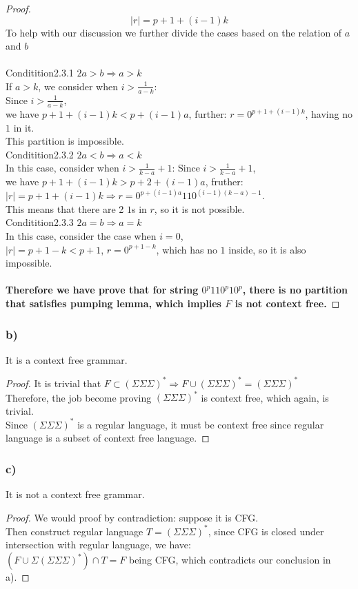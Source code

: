 \documentclass{article}
\begin{document}
\begin{proof}
				$$|r| = p+1+(i-1)k$$
				To help with our discussion we further divide the cases based on the relation of $a$ and $b$\\
			\\
			Conditition2.3.1 $2a > b \Rightarrow a > k$ \\
				If $a>k$, we consider when $i > \frac{1}{a-k}$: \\
				Since $i > \frac{1}{a-k}$, \\
				we have $p+1+(i-1)k < p+(i-1)a$, further:
				$r = 0^{p+1+(i-1)k}$, having no $1$ in it. \\
				This partition is impossible. 
			\\
			Conditition2.3.2 $2a < b \Rightarrow a < k$ \\
				In this case, consider when $i > \frac{1}{k-a} + 1$:
				Since $i > \frac{1}{k-a} + 1$, \\
				we have $p+1+(i-1)k > p+2+(i-1)a$, fruther: 
				$|r| = p+1+(i-1)k \Rightarrow r = 0^{p+(i-1)a}110^{(i-1)(k-a)-1}$.\\
				This means that there are 2 $1$s in $r$, so it is not possible. \\
			Conditition2.3.3 $2a = b \Rightarrow a = k$ \\
				In this case, consider the case when $i = 0$, \\
				$|r| = p+1-k < p + 1$, $r = 0^{p+1-k}$, which has no $1$ inside, so it is also impossible.
		\\ \\
		\textbf{Therefore we have prove that for string $0^{p}110^{p}10^{p}$, there is no partition that satisfies pumping lemma, which implies $F$ is not context free.}

	\end{proof}

\subsubsection{b)}
	It is a context free grammar.
	\begin{proof}
		It is trivial that $F \subset (\Sigma\Sigma\Sigma)^* \Rightarrow F \cup (\Sigma \Sigma \Sigma)^* = (\Sigma \Sigma \Sigma)^*$ \\
		Therefore, the job become proving $(\Sigma \Sigma \Sigma)^*$ is context free, which again, is trivial.\\
		Since $(\Sigma \Sigma \Sigma)^*$ is a regular language, it must be context free since regular language is a subset of context free language.
	\end{proof}
\subsubsection{c)}
	It is not a context free grammar.
	\begin{proof}
		We would proof by contradiction: suppose it is CFG. \\
		Then construct regular language $T = (\Sigma\Sigma\Sigma)^*$, since CFG is closed under intersection with regular language, we have:\\
		$(F\cup\Sigma(\Sigma\Sigma\Sigma)^*) \cap T = F$ being CFG, which contradicts our conclusion in a).
	\end{proof}
\end{document}
